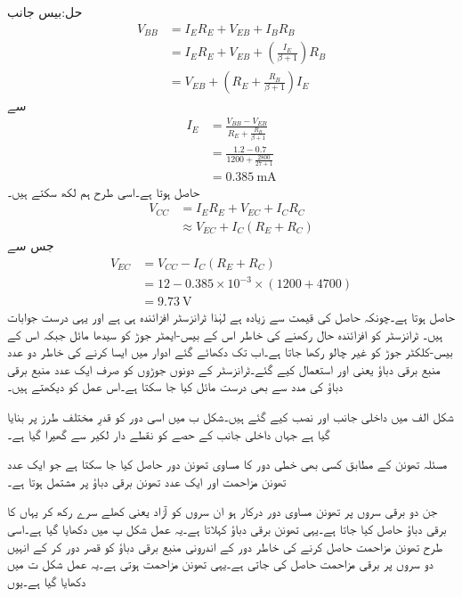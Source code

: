 حل:بیس جانب
\begin{align*}
V_{BB}&=I_E R_E+V_{EB}+I_B R_B\\
&=I_E R_E +V_{EB}+\left(\frac{I_E}{\beta+1} \right)R_B\\
&=V_{EB}+\left(R_E+\frac{R_B}{\beta+1} \right) I_E
\end{align*}
سے
\begin{align*}
I_E&=\frac{V_{BB}-V_{EB}}{R_E+\frac{R_B}{\beta+1}}\\
&=\frac{1.2-0.7}{1200+\frac{2800}{27+1}}\\
&=\SI{0.385}{\milli \ampere}
\end{align*}
حاصل ہوتا ہے۔اسی طرح ہم لکھ سکتے ہیں۔
\begin{align*}
V_{CC}&=I_E R_E +V_{EC}+I_C R_C\\
&\approx V_{EC}+I_C \left(R_E+R_C \right)
\end{align*}
جس سے
\begin{align*}
V_{EC}&=V_{CC}-I_C \left(R_E+R_C \right)\\
&=12-0.385 \times 10^{-3} \times \left(1200+4700 \right)\\
&=\SI{9.73}{\volt}
\end{align*}
حاصل ہوتا ہے۔چونکہ حاصل  کی قیمت  سے زیادہ ہے لہٰذا ٹرانزسٹر افزائندہ ہی ہے اور یہی درست جوابات ہیں۔ 
ٹرانزسٹر کو افزائندہ حال  رکھنے کی خاطر اس کے بیس-ایمٹر  جوڑ کو سیدھا مائل جبکہ اس کے بیس-کلکٹر جوڑ کو غیر چالو رکھا جاتا ہے۔اب تک دکھائے گئے ادوار میں ایسا کرنے کی خاطر دو عدد منبع برقی دباؤ یعنی  اور   استعمال کیے گئے۔ٹرانزسٹر کے دونوں جوڑوں کو صرف ایک عدد منبع برقی دباؤ کی مدد سے بھی درست مائل کیا جا سکتا ہے۔اس عمل کو دیکھتے ہیں۔

شکل  الف میں داخلی جانب   اور  نصب کیے گئے ہیں۔شکل  ب میں اسی دور کو قدرِ مختلف طرز پر بنایا گیا ہے جہاں داخلی جانب کے حصے کو نقطے دار لکیر سے گھیرا گیا ہے۔

مسئلہ تھونن  کے مطابق کسی بھی خطی دور کا مساوی تھونن دور حاصل کیا جا سکتا ہے جو ایک عدد تھونن مزاحمت   اور ایک عدد تھونن برقی دباؤ  پر مشتمل ہوتا ہے۔

جن دو برقی سروں پر تھونن مساوی دور درکار ہو ان سروں کو آزاد یعنی کھلے سرے  رکھ کر یہاں کا برقی دباؤ حاصل کیا جاتا ہے۔یہی تھونن برقی دباؤ  کہلاتا ہے۔یہ عمل شکل  پ میں دکھایا گیا ہے۔اسی طرح تھونن مزاحمت   حاصل کرنے کی خاطر دور کے اندرونی منبع برقی دباؤ  کو قصر دور  کر کے انہیں دو سروں پر برقی مزاحمت حاصل کی جاتی ہے۔یہی تھونن مزاحمت ہوتی ہے۔یہ عمل شکل  ت میں دکھایا گیا ہے۔یوں

